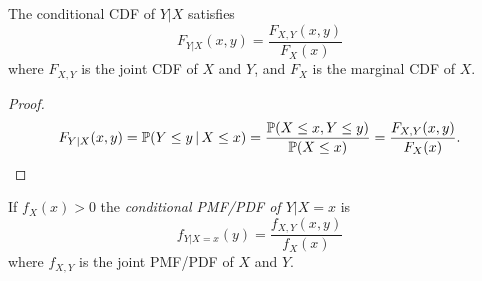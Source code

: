 \begin{lemma}
The conditional CDF of $Y|X$ satisfies 
\[
F_{Y|X}(x,y) = \frac{F_{X,Y}(x,y)}{F_X(x)}
\]
where $F_{X,Y}$ is the joint CDF of $X$ and $Y$, and $F_X$ is the marginal CDF of $X$.
\end{lemma}
\begin{proof}
\[
F_{Y|X}(x,y) 
	= \mathbb{P}(Y\leq y\,|\,X\leq x)
	= \frac{\mathbb{P}(X\leq x, Y\leq y)}{\mathbb{P}(X\leq x)}
	= \frac{F_{X,Y}(x,y)}{F_X(x)}.
\]
\end{proof}

%
%
%
%

\begin{definition}
If $f_X(x)>0$ the \emph{conditional PMF/PDF of $Y|X=x$} is 
\[
f_{Y|X=x}(y) = \frac{f_{X,Y}(x,y)}{f_X(x)}
\]
where $f_{X,Y}$ is the joint PMF/PDF of $X$ and $Y$.
\end{definition}

